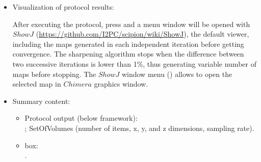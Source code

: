 \begin{itemize}
  \item Visualization of protocol results:
  
  After executing the protocol, press  and a menu window will be opened with $ShowJ$ (\url{https://github.com/I2PC/scipion/wiki/ShowJ}), the default \scipion viewer, including the maps generated in each independent iteration before getting convergence. The sharpening algorithm stops when the difference between two successive iterations is lower than 1\%, thus generating variable number of maps before stopping. The $ShowJ$ window menu () allows to open the selected map in $Chimera$ graphics window.
  
  \item Summary content:
  \begin{itemize}
     \item Protocol output (below \scipion framework):\\ ; SetOfVolumes (number of items, x, y, and z dimensions, sampling rate).
     \item {} box:\\ .
  \end{itemize}
    
\end{itemize}

